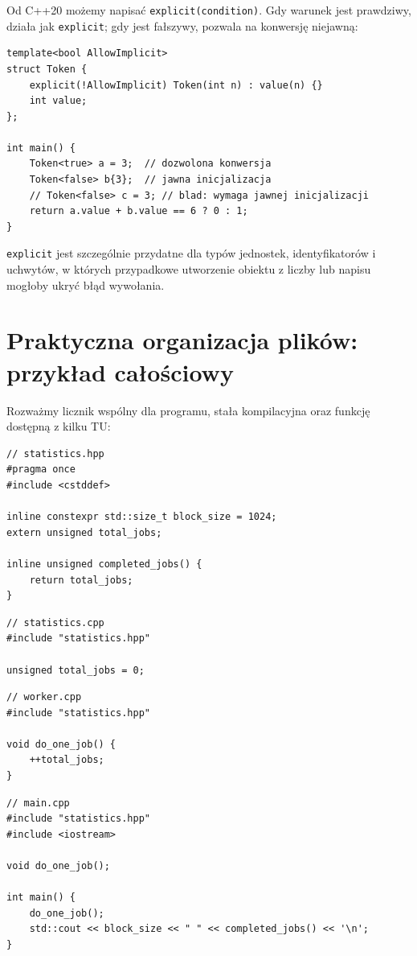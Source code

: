 Od C++20 możemy napisać \texttt{explicit(condition)}. Gdy warunek
jest prawdziwy, działa jak \texttt{explicit}; gdy jest fałszywy,
pozwala na konwersję niejawną:

\begin{lstlisting}[caption={Warunkowe explicit od C++20 (kompletny program).}]
template<bool AllowImplicit>
struct Token {
    explicit(!AllowImplicit) Token(int n) : value(n) {}
    int value;
};

int main() {
    Token<true> a = 3;  // dozwolona konwersja
    Token<false> b{3};  // jawna inicjalizacja
    // Token<false> c = 3; // blad: wymaga jawnej inicjalizacji
    return a.value + b.value == 6 ? 0 : 1;
}
\end{lstlisting}

\texttt{explicit} jest szczególnie przydatne dla typów jednostek,
identyfikatorów i uchwytów, w których przypadkowe utworzenie obiektu
z liczby lub napisu mogłoby ukryć błąd wywołania.

\section{Praktyczna organizacja plików: przykład całościowy}

Rozważmy licznik wspólny dla programu, stała kompilacyjna
oraz funkcję dostępną z kilku TU:

\begin{lstlisting}
// statistics.hpp
#pragma once
#include <cstddef>

inline constexpr std::size_t block_size = 1024;
extern unsigned total_jobs;

inline unsigned completed_jobs() {
    return total_jobs;
}
\end{lstlisting}

\begin{lstlisting}
// statistics.cpp
#include "statistics.hpp"

unsigned total_jobs = 0;
\end{lstlisting}

\begin{lstlisting}
// worker.cpp
#include "statistics.hpp"

void do_one_job() {
    ++total_jobs;
}
\end{lstlisting}

\begin{lstlisting}
// main.cpp
#include "statistics.hpp"
#include <iostream>

void do_one_job();

int main() {
    do_one_job();
    std::cout << block_size << " " << completed_jobs() << '\n';
}
\end{lstlisting}


